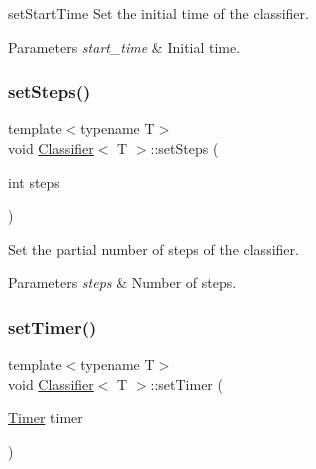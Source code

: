 set\+Start\+Time Set the initial time of the classifier. 


\begin{DoxyParams}{Parameters}
{\em start\+\_\+time} & Initial time. \\
\hline
\end{DoxyParams}
\mbox{\label{class_classifier_a55c37a2a00b3dce578d6fde547376dae}} 
\subsubsection{\texorpdfstring{set\+Steps()}{setSteps()}}
{\footnotesize\ttfamily template$<$typename T$>$ \\
void \mbox{\hyperlink{class_classifier}{Classifier}}$<$ T $>$\+::set\+Steps (\begin{DoxyParamCaption}\item[{int}]{steps }\end{DoxyParamCaption})\hspace{0.3cm}{\ttfamily [inline]}}



Set the partial number of steps of the classifier. 


\begin{DoxyParams}{Parameters}
{\em steps} & Number of steps. \\
\hline
\end{DoxyParams}
\mbox{\label{class_classifier_ad86224f59e1c7722fa34f63707bf0221}} 
\subsubsection{\texorpdfstring{set\+Timer()}{setTimer()}}
{\footnotesize\ttfamily template$<$typename T$>$ \\
void \mbox{\hyperlink{class_classifier}{Classifier}}$<$ T $>$\+::set\+Timer (\begin{DoxyParamCaption}\item[{\mbox{\hyperlink{class_timer}{Timer}}}]{timer }\end{DoxyParamCaption})\hspace{0.3cm}{\ttfamily [inline]}}



